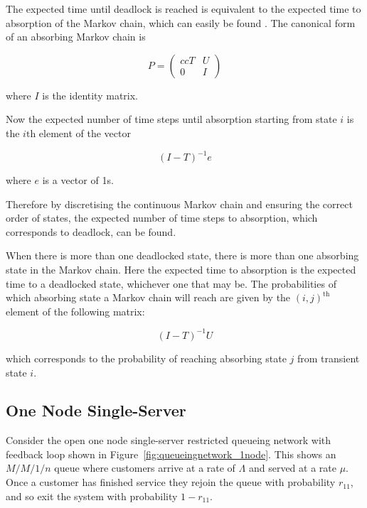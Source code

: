 \documentclass{article}
\numberwithin{equation}{section}
\begin{document}
The expected time until deadlock is reached is equivalent to the expected time to absorption of the Markov chain, which can easily be found \cite{stewart09}.
The canonical form of an absorbing Markov chain is

\begin{equation*}
P = \left(\begin{matrix}{cc} T & U\\ 0 & I \end{matrix} \right)
\end{equation*}

where $I$ is the identity matrix.

Now the expected number of time steps until absorption starting from state $i$ is the $i\text{th}$ element of the vector

\begin{equation} \label{eq:abs_probs}
  (I - T)^{-1}e
\end{equation}

where $e$ is a vector of 1s.

Therefore by discretising the continuous Markov chain and ensuring the correct order of states, the expected number of time steps to absorption, which corresponds to deadlock, can be found.

When there is more than one deadlocked state, there is more than one absorbing state in the Markov chain.
Here the expected time to absorption is the expected time to a deadlocked state, whichever one that may be.
The probabilities of which absorbing state a Markov chain will reach are given by the $(i, j)^{\text{th}}$ element of the following matrix:

\begin{equation}
  (I - T)^{-1}U
\end{equation}

which corresponds to the probability of reaching absorbing state $j$ from transient state $i$.


\subsection{One Node Single-Server}\label{sec:1nodenet}

Consider the open one node single-server restricted queueing network with feedback loop shown in Figure~\ref{fig:queueingnetwork_1node}.
This shows an \(M/M/1/n\) queue where customers arrive at a rate of $\Lambda$ and served at a rate $\mu$.
Once a customer has finished service they rejoin the queue with probability $r_{11}$, and so exit the system with probability $1 - r_{11}$.
\end{document}
